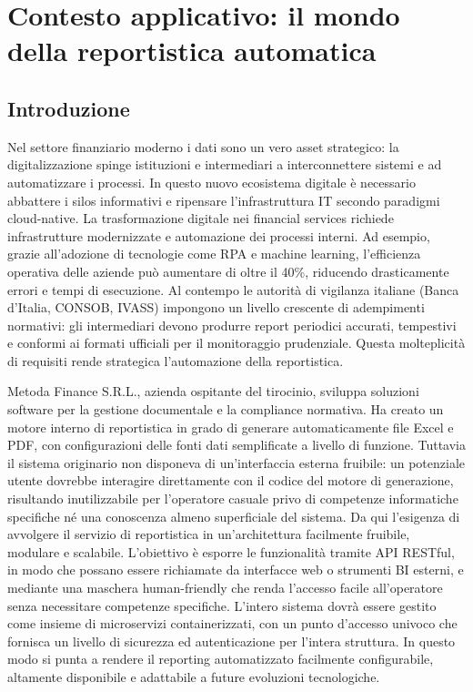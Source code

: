 \chapter{Contesto applicativo: il mondo della reportistica automatica}
\section{Introduzione}
Nel settore finanziario moderno i dati sono un vero asset strategico: la digitalizzazione spinge istituzioni e intermediari a interconnettere sistemi e ad automatizzare i processi. In questo nuovo ecosistema digitale è necessario abbattere i silos informativi e ripensare l’infrastruttura IT secondo paradigmi cloud-native.
La trasformazione digitale nei financial services richiede infrastrutture modernizzate e automazione dei processi interni. Ad esempio, grazie all’adozione di tecnologie come RPA e machine learning, l’efficienza operativa delle aziende può aumentare di oltre il 40\%, riducendo drasticamente errori e tempi di esecuzione. Al contempo le autorità di vigilanza italiane (Banca d’Italia, CONSOB, IVASS) impongono un livello crescente di adempimenti normativi: gli intermediari devono produrre report periodici accurati, tempestivi e conformi ai formati ufficiali per il monitoraggio prudenziale. Questa molteplicità di requisiti rende strategica l’automazione della reportistica.

Metoda Finance S.R.L., azienda ospitante del tirocinio, sviluppa soluzioni software per la gestione documentale e la compliance normativa. Ha creato un motore interno di reportistica in grado di generare automaticamente file Excel e PDF, con configurazioni delle fonti dati semplificate a livello di funzione. Tuttavia il sistema originario non disponeva di un’interfaccia esterna fruibile: un potenziale utente dovrebbe interagire direttamente con il codice del motore di generazione, risultando inutilizzabile per l'operatore casuale privo di competenze informatiche specifiche né una conoscenza almeno superficiale del sistema. Da qui l’esigenza di avvolgere il servizio di reportistica in un'architettura facilmente fruibile, modulare e scalabile. L’obiettivo è esporre le funzionalità tramite API RESTful, in modo che possano essere richiamate da interfacce web o strumenti BI esterni, e mediante una maschera human-friendly che renda l'accesso facile all'operatore senza necessitare competenze specifiche. L’intero sistema dovrà essere gestito come insieme di microservizi containerizzati, con un punto d'accesso univoco che fornisca un livello di sicurezza ed autenticazione per l'intera struttura. In questo modo si punta a rendere il reporting automatizzato facilmente configurabile, altamente disponibile e adattabile a future evoluzioni tecnologiche.

